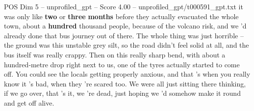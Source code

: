 \begin{textsample}{POS Dim 5 – unprofiled\_gpt – Score 4.00 – unprofiled\_gpt/t000591\_gpt.txt}  \label{ex:f5_pos_037}
it was only like \textbf{two} or \textbf{three} \textbf{months} before they actually evacuated the whole town, about a \textbf{hundred} thousand people, because of the volcano risk, and we ’d already done that bus journey out of there.
The whole thing was just horrible – the ground was this unstable grey silt, so the road didn't feel solid at all, and the bus itself was really crappy.
Then on this really sharp bend, with about a hundred‑metre drop right next to us, one of the tyres actually started to come off.
You could see the locals getting properly anxious, and that ’s when you really know it ’s bad, when they ’re scared too.
We were all just sitting there thinking, if we go over, that ’s it, we ’re dead, just hoping we ’d somehow make it round and get off alive.

\end{textsample}
